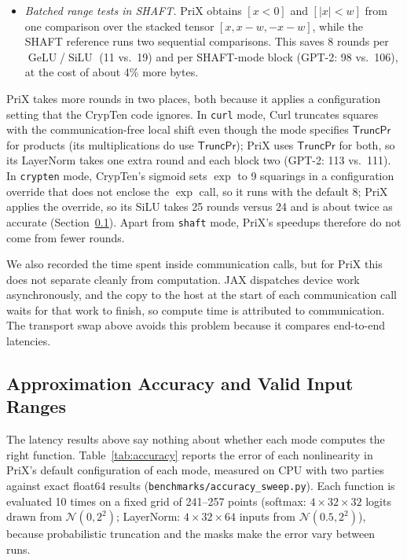 \documentclass[11pt]{article}
\begin{document}
\begin{itemize}
\begin{itemize}
        \item \emph{Batched range tests in SHAFT.} PriX obtains $[x < 0]$ and $[|x| < w]$ from one comparison over the stacked tensor $[x, x - w, -x - w]$, while the SHAFT reference runs two sequential comparisons. This saves 8 rounds per $\operatorname{GeLU}$/$\operatorname{SiLU}$ (11 vs.\ 19) and per SHAFT-mode block (GPT-2: 98 vs.\ 106), at the cost of about 4\% more bytes.
    \end{itemize}
    PriX takes more rounds in two places, both because it applies a configuration setting that the CrypTen code ignores. In \texttt{curl} mode, Curl truncates squares with the communication-free local shift even though the mode specifies $\mathsf{TruncPr}$ for products (its multiplications do use $\mathsf{TruncPr}$); PriX uses $\mathsf{TruncPr}$ for both, so its LayerNorm takes one extra round and each block two (GPT-2: 113 vs.\ 111). In \texttt{crypten} mode, CrypTen's sigmoid sets $\exp$ to 9 squarings in a configuration override that does not enclose the $\exp$ call, so it runs with the default 8; PriX applies the override, so its SiLU takes 25 rounds versus 24 and is about twice as accurate (Section~\ref{sec:accuracy}). Apart from \texttt{shaft} mode, PriX's speedups therefore do not come from fewer rounds.
\end{itemize}
We also recorded the time spent inside communication calls, but for PriX this does not separate cleanly from computation. JAX dispatches device work asynchronously, and the copy to the host at the start of each communication call waits for that work to finish, so compute time is attributed to communication. The transport swap above avoids this problem because it compares end-to-end latencies.

\subsection{Approximation Accuracy and Valid Input Ranges}
\label{sec:accuracy}
The latency results above say nothing about whether each mode computes the right function. Table~\ref{tab:accuracy} reports the error of each nonlinearity in PriX's default configuration of each mode, measured on CPU with two parties against exact float64 results (\texttt{benchmarks/accuracy\_sweep.py}). Each function is evaluated 10 times on a fixed grid of 241--257 points (softmax: $4 \times 32 \times 32$ logits drawn from $\mathcal{N}(0, 2^2)$; LayerNorm: $4 \times 32 \times 64$ inputs from $\mathcal{N}(0.5, 2^2)$), because probabilistic truncation and the masks make the error vary between runs.
\end{document}
